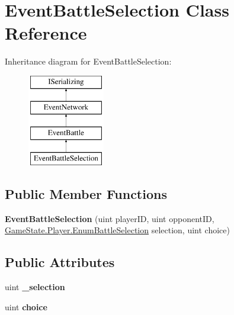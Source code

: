 \hypertarget{class_event_battle_selection}{\section{Event\-Battle\-Selection Class Reference}
\label{class_event_battle_selection}
}
Inheritance diagram for Event\-Battle\-Selection\-:\begin{figure}[H]
\begin{center}
\leavevmode
\includegraphics[height=4.000000cm]{class_event_battle_selection}
\end{center}
\end{figure}
\subsection*{Public Member Functions}
\begin{DoxyCompactItemize}
\item 
\hypertarget{class_event_battle_selection_a8cdfccc9d7b5e9bda4d9a62c31f509ca}{{\bfseries Event\-Battle\-Selection} (uint player\-I\-D, uint opponent\-I\-D, \hyperlink{struct_game_state_1_1_player_a9f54c5eca1e60acbaa2074e981f51615}{Game\-State.\-Player.\-Enum\-Battle\-Selection} selection, uint choice)}\label{class_event_battle_selection_a8cdfccc9d7b5e9bda4d9a62c31f509ca}

\end{DoxyCompactItemize}
\subsection*{Public Attributes}
\begin{DoxyCompactItemize}
\item 
\hypertarget{class_event_battle_selection_a3f31e68cd024e74edbf0d8732d8d4cf6}{uint {\bfseries \-\_\-selection}}\label{class_event_battle_selection_a3f31e68cd024e74edbf0d8732d8d4cf6}

\item 
\hypertarget{class_event_battle_selection_afee34860cf0eab39082bc15a73d8e299}{uint {\bfseries choice}}\label{class_event_battle_selection_afee34860cf0eab39082bc15a73d8e299}

\end{DoxyCompactItemize}
